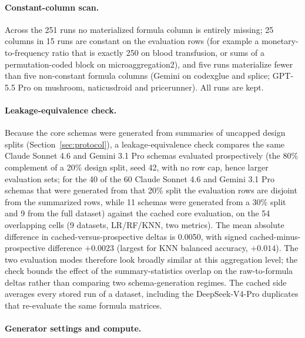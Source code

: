 \paragraph{Constant-column scan.}

Across the 251 runs no materialized formula column is entirely missing; 25 columns in 15 runs are constant on the evaluation rows (for example a monetary-to-frequency ratio that is exactly 250 on blood transfusion, or sums of a permutation-coded block on microaggregation2), and five runs materialize fewer than five non-constant formula columns (Gemini on codexglue and splice; GPT-5.5 Pro on mushroom, naticusdroid and pricerunner). All runs are kept.

\paragraph{Leakage-equivalence check.}

Because the core schemas were generated from summaries of uncapped design splits (Section~\ref{sec:protocol}), a leakage-equivalence check compares the same Claude Sonnet 4.6 and Gemini 3.1 Pro schemas evaluated prospectively (the 80\% complement of a 20\% design split, seed 42, with no row cap, hence larger evaluation sets; for the 40 of the 60 Claude Sonnet 4.6 and Gemini 3.1 Pro schemas that were generated from that 20\% split the evaluation rows are disjoint from the summarized rows, while 11 schemas were generated from a 30\% split and 9 from the full dataset) against the cached core evaluation, on the 54 overlapping cells (9 datasets, LR/RF/KNN, two metrics). The mean absolute difference in cached-versus-prospective deltas is 0.0050, with signed cached-minus-prospective difference \(+0.0023\) (largest for KNN balanced accuracy, \(+0.014\)). The two evaluation modes therefore look broadly similar at this aggregation level; the check bounds the effect of the summary-statistics overlap on the raw-to-formula deltas rather than comparing two schema-generation regimes. The cached side averages every stored run of a dataset, including the DeepSeek-V4-Pro duplicates that re-evaluate the same formula matrices.

\paragraph{Generator settings and compute.}


